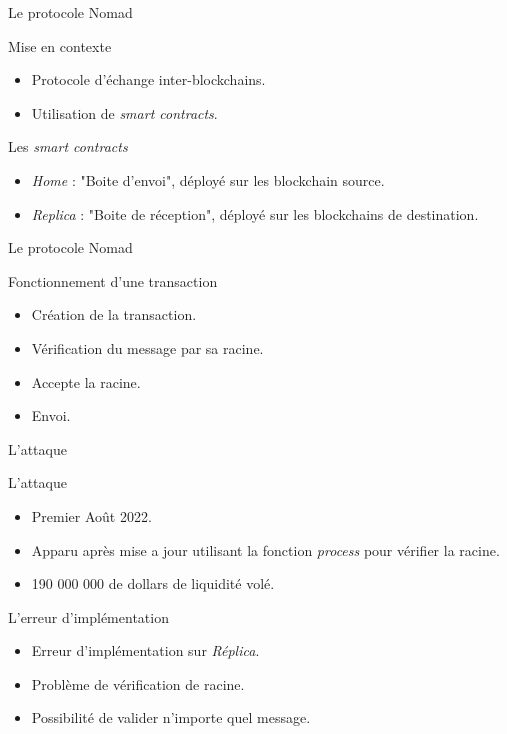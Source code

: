 \begin{frame}{Le protocole Nomad}
    \begin{block}{Mise en contexte}
        \begin{itemize}
            \item Protocole d'échange inter-blockchains.
            \item Utilisation de \textit{smart contracts}.
        \end{itemize}
    \end{block}
    \begin{block}{Les \textit{smart contracts}}
        \begin{itemize}
            \item \textit{Home} : "Boite d'envoi", déployé sur les blockchain source.
            \item \textit{Replica} : "Boite de réception", déployé sur les blockchains de destination.
        \end{itemize}
    \end{block}
\end{frame}

\begin{frame}{Le protocole Nomad}
    \begin{block}{Fonctionnement d'une transaction}
        \begin{itemize}
            \item Création de la transaction.
            \item Vérification du message par sa racine.
            \item Accepte la racine.
            \item Envoi.
        \end{itemize}
    \end{block}
\end{frame}

\begin{frame}{L'attaque}
    \begin{block}{L'attaque}
        \begin{itemize}
            \item Premier Août 2022.
            \item Apparu après mise a jour utilisant la fonction \textit{process} pour vérifier la racine.
            \item 190 000 000 de dollars de liquidité volé.
        \end{itemize}
    \end{block}
    \begin{block}{L'erreur d'implémentation}
        \begin{itemize}
            \item Erreur d'implémentation sur \textit{Réplica}.
            \item Problème de vérification de racine.
            \item Possibilité de valider n'importe quel message.
        \end{itemize}
    \end{block}
\end{frame}

